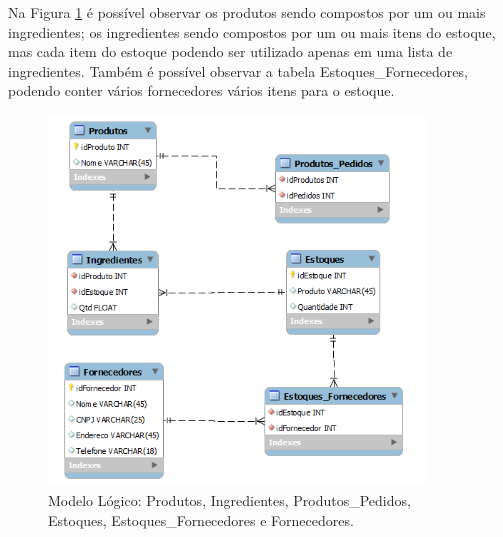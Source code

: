\documentclass[
	12pt,				%
	openright,			%
	oneside,			%
	a4paper,			%
	chapter=TITLE,		%
	section=TITLE,		%
	english,			%
	brazil				%
	]{abntex2}
\begin{document}
    Na Figura \ref{ml_02} é possível observar os produtos sendo compostos por um ou mais ingredientes; 
    os ingredientes sendo compostos por um ou mais itens do estoque, mas cada item do estoque podendo 
    ser utilizado apenas em uma lista de ingredientes. Também é possível observar a tabela Estoques\_Fornecedores, 
    podendo conter vários fornecedores vários itens para o estoque.
    \begin{figure}[h]
         \centering
         \includegraphics[width=10cm,keepaspectratio]{Imgs/ML_02}
         \caption{Modelo Lógico: Produtos, Ingredientes, Produtos\_Pedidos, Estoques, Estoques\_Fornecedores e Fornecedores.}
         \label{ml_02}
    \end{figure}
    
        \newpage
    
\end{document}
